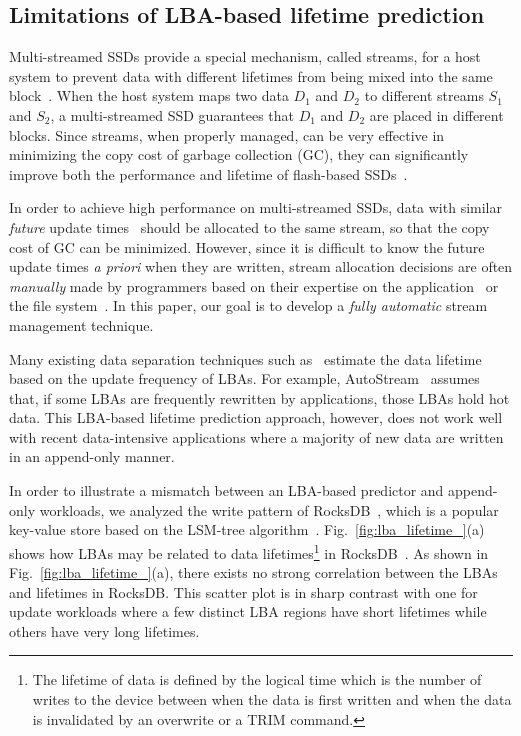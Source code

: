 \subsection{Limitations of LBA-based lifetime prediction}
Multi-streamed SSDs provide a special mechanism,
called streams, for a host system to prevent data with different lifetimes 
from being mixed into the same block~\cite{T10, MultiStream}.
When the host system maps two data $D_1$ and $D_2$ to 
different streams $S_1$ and $S_2$, a multi-streamed SSD guarantees that 
$D_1$ and $D_2$ are placed in different blocks.   
Since streams, when properly managed, can be very effective in minimizing 
the copy cost of garbage collection (GC), they
can significantly improve both the performance and lifetime of 
flash-based SSDs~\cite{MultiStream, Level, FStream, AutoStream}.

In order to achieve high performance on multi-streamed SSDs, data with similar 
{\it future} update times~\cite{PCHa}
should be allocated 
to the same stream, so that the copy cost of GC can be minimized.
However, since it is difficult to know the future update times {\it a priori} when they are written,
stream allocation decisions are often {\it manually} made 
by programmers based on their expertise
on the application~\cite{MultiStream, Level} or the file system~\cite{FStream}.  
In this paper, our goal is to develop 
a {\it fully automatic} stream management technique. %

Many existing data separation techniques such as~\cite{AutoStream, HotCold} 
estimate the data lifetime based on the update frequency of LBAs.  
For example, \textsf{\small AutoStream}~\cite{AutoStream} assumes that, if
some LBAs are frequently rewritten by applications, those LBAs hold hot data.
This LBA-based lifetime prediction 
approach, however, does not work well with recent data-intensive 
applications where a majority of
new data are written in an append-only manner.  

In order to illustrate a mismatch between an LBA-based predictor and 
append-only workloads, we analyzed the write pattern of 
RocksDB~\cite{RocksDB}, which is a
popular key-value store based on the LSM-tree algorithm~\cite{LSM}.
Fig.~\ref{fig:lba_lifetime_}(a) shows how LBAs may be related 
to data lifetimes\footnote{The lifetime of data is defined 
by the logical time which is the number of writes to the device 
between when the data is first written 
and when the data is invalidated by an overwrite or a TRIM command.}
in RocksDB~\cite{RocksDB}.  
As shown in Fig.~\ref{fig:lba_lifetime_}(a), 
there exists no strong correlation between the LBAs and lifetimes in RocksDB.  
This scatter plot is in sharp contrast with one for update workloads 
where a few distinct LBA regions have short lifetimes while others 
have very long lifetimes.

